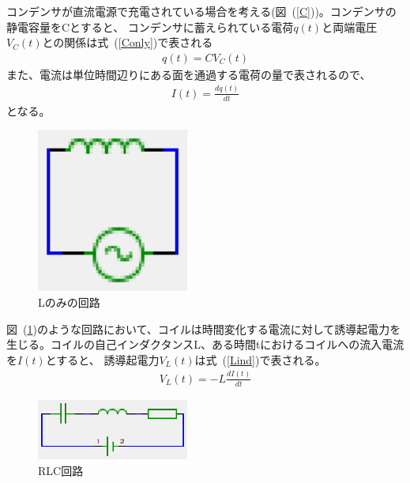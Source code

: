 \documentclass[a4j,10pt]{jarticle}
\newcommand{\Equref}[1]{式~(\ref{#1})}
\newcommand{\Figref}[1]{図~(\ref{#1})}
\begin{document}
コンデンサが直流電源で充電されている場合を考える(\Figref{C})。コンデンサの静電容量をCとすると、
コンデンサに蓄えられている電荷$q(t)$と両端電圧$V_{C}(t)$との関係は\Equref{Conly}で表される
\begin{eqnarray}
\label{Conly}
q(t)=CV_{C}(t)
\end{eqnarray}
また、電流は単位時間辺りにある面を通過する電荷の量で表されるので、
\begin{eqnarray}
I(t)=\frac{dq(t)}{dt}
\end{eqnarray}
となる。


\begin{figure}[h]
\begin{center}
\includegraphics[width=5cm]{L.eps}
\caption{Lのみの回路}
\label{L}
\end{center}
\end{figure}

\Figref{L}のような回路において、コイルは時間変化する電流に対して誘導起電力を生じる。コイルの自己インダクタンスL、ある時間tにおけるコイルへの流入電流を$I(t)$とすると、
誘導起電力$V_{L}(t)$は\Equref{Lind}で表される。
\begin{eqnarray}
\label{Lind}
V_{L}(t)=-L\frac{dI(t)}{dt}
\end{eqnarray}
\begin{figure}[h]
\begin{center}
\includegraphics[width=5cm]{RLC.eps}
\caption{RLC回路}
\label{RLC}
\end{center}
\end{figure}
\end{document}
